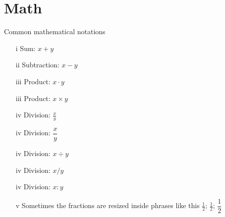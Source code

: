 \documentclass[12pt, a4paper]{article}
\begin{document}
%
%
%
%
%
%
%
%
%
%
%
%
%
%
%

\section{Math}
Common mathematical notations

\begin{itemize} %
    \item[i] Sum: $x+y$
    \item[ii] Subtraction: $x-y$
    \item[iii] Product: $x\cdot y$
    \item[iii] Product: $x\times y$
    \item[iv] Division: $\frac{x}{y}$
    \item[iv] Division: $\dfrac{x}{y}$
    \item[iv] Division: $x\div y$
    \item[iv] Division: $x / y$
    \item[iv] Division: $x : y$
    \item[v] Sometimes the fractions are resized inside phrases like this $\displaystyle \frac{1}{2}$; $\frac{1}{2}$; $\dfrac{1}{2}$
\end{itemize}
\end{document}
